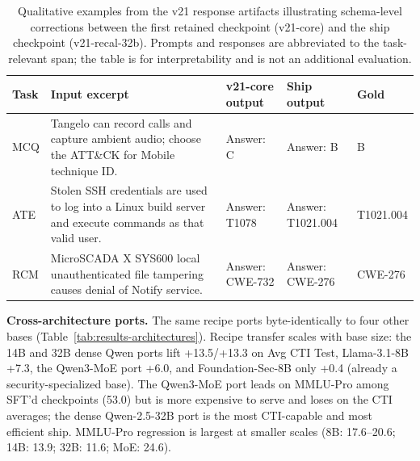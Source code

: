 \documentclass[conference]{IEEEtran}
\begin{document}
\begin{table}[t]
\centering
\caption{Qualitative examples from the v21 response artifacts illustrating schema-level corrections between the first retained checkpoint (v21-core) and the ship checkpoint (v21-recal-32b). Prompts and responses are abbreviated to the task-relevant span; the table is for interpretability and is not an additional evaluation.}
\label{tab:qual-examples}
\scriptsize
\setlength{\tabcolsep}{3pt}
\begin{tabular}{p{0.8cm}p{4.2cm}p{3.4cm}p{3.6cm}p{2.8cm}}
\hline
\textbf{Task} & \textbf{Input excerpt} & \textbf{v21-core output} & \textbf{Ship output} & \textbf{Gold} \\
\hline
MCQ & Tangelo can record calls and capture ambient audio; choose the ATT\&CK for Mobile technique ID. & Answer: C & Answer: B & B \\
ATE & Stolen SSH credentials are used to log into a Linux build server and execute commands as that valid user. & Answer: T1078 & Answer: T1021.004 & T1021.004 \\
RCM & MicroSCADA X SYS600 local unauthenticated file tampering causes denial of Notify service. & Answer: CWE-732 & Answer: CWE-276 & CWE-276 \\
\hline
\end{tabular}
\end{table}
\textbf{Cross-architecture ports.} The same recipe ports byte-identically to four other bases (Table~\ref{tab:results-architectures}). Recipe transfer scales with base size: the 14B and 32B dense Qwen ports lift +13.5/+13.3 on Avg CTI Test, Llama-3.1-8B +7.3, the Qwen3-MoE port +6.0, and Foundation-Sec-8B only +0.4 (already a security-specialized base). The Qwen3-MoE port leads on MMLU-Pro among SFT'd checkpoints (53.0) but is more expensive to serve and loses on the CTI averages; the dense Qwen-2.5-32B port is the most CTI-capable and most efficient ship. MMLU-Pro regression is largest at smaller scales (8B: 17.6--20.6; 14B: 13.9; 32B: 11.6; MoE: 24.6).
\end{document}

